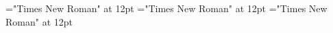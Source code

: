 \documentclass[a4paper]{article}
\begin{document}
 
\pagestyle{plain} 
\font\scrBookscrBody="Times New Roman" at 12pt
\font\SectionHeadMinorscrBookscrBody="Times New Roman" at 12pt
\font\spanbgtSectionHeadMinorscrBookscrBody="Times New Roman" at 12pt

\pagestyle{fancy} 

\end{document}
